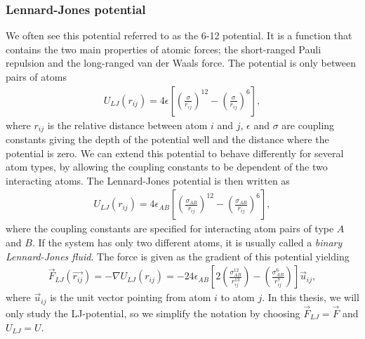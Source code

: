 \subsubsection{Lennard-Jones potential}
\label{sec:md_lj_potential}
We often see this potential referred to as the 6-12 potential. It is a function that contains the two main properties of atomic forces; the short-ranged Pauli repulsion and the long-ranged van der Waals force. The potential is only between pairs of atoms
\begin{align}
	\label{eq:md_potential_energy}
	U_{LJ}(r_{ij}) = 4\epsilon\left[\left(\frac{\sigma}{r_{ij}}\right)^{12} - \left(\frac{\sigma}{r_{ij}}\right)^{6}\right],
\end{align}
where $r_{ij}$ is the relative distance between atom $i$ and $j$, $\epsilon$ and $\sigma$ are coupling constants giving the depth of the potential well and the distance where the potential is zero. We can extend this potential to behave differently for several atom types, by allowing the coupling constants to be dependent of the two interacting atoms. The Lennard-Jones potential is then written as
\begin{align}
	U_{LJ}(r_{ij}) = 4\epsilon_{AB}\left[\left(\frac{\sigma_{AB}}{r_{ij}}\right)^{12} - \left(\frac{\sigma_{AB}}{r_{ij}}\right)^{6}\right],
\end{align}
where the coupling constants are specified for interacting atom pairs of type $A$ and $B$. If the system has only two different atoms, it is usually called a \textit{binary Lennard-Jones fluid}. The force is given as the gradient of this potential yielding 
\begin{align*}
	\vec F_{LJ}(\vec{r_{ij}}) = -\nabla U_{LJ}(r_{ij}) = -24\epsilon_{AB}\left[2\left(\frac{\sigma_{AB}^{12}}{r_{ij}^{13}}\right) - \left(\frac{\sigma_{AB}^6}{r_{ij}^7}\right)\right]\vec u_{ij},
\end{align*}
where $\vec u_{ij}$ is the unit vector pointing from atom $i$ to atom $j$. In this thesis, we will only study the LJ-potential, so we simplify the notation by choosing $\vec F_{LJ} = \vec F$ and $U_{LJ} = U$.
